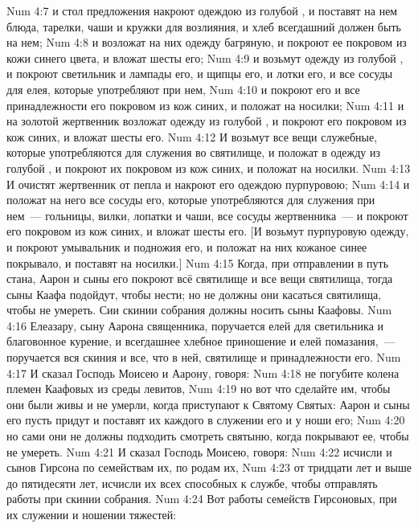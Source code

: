 \vs Num 4:7 и стол  предложения накроют одеждою из голубой , и поставят на нем блюда, тарелки, чаши и кружки для возлияния, и хлеб  всегдашний должен быть на нем;
\vs Num 4:8 и возложат на них одежду багряную, и покроют ее покровом из кожи синего цвета, и вложат шесты его;
\vs Num 4:9 и возьмут одежду из голубой , и покроют светильник и лампады его, и щипцы его, и лотки его, и все сосуды для елея, которые употребляют при нем,
\vs Num 4:10 и покроют его и все принадлежности его покровом из кож синих, и положат на носилки;
\vs Num 4:11 и на золотой жертвенник возложат одежду из голубой , и покроют его покровом из кож синих, и вложат шесты его.
\vs Num 4:12 И возьмут все вещи служебные, которые употребляются для служения во святилище, и положат в одежду из голубой , и покроют их покровом из кож синих, и положат на носилки.
\vs Num 4:13 И очистят жертвенник от пепла и накроют его одеждою пурпуровою;
\vs Num 4:14 и положат на него все сосуды его, которые употребляются для служения при нем~--- гольницы, вилки, лопатки и чаши, все сосуды жертвенника~--- и покроют его покровом из кож синих, и вложат шесты его. [И возьмут пурпуровую одежду, и покроют умывальник и подножия его, и положат на них кожаное синее покрывало, и поставят на носилки.]
\vs Num 4:15 Когда, при отправлении в путь стана, Аарон и сыны его покроют всё святилище и все вещи святилища, тогда сыны Каафа подойдут, чтобы нести; но не должны они касаться святилища, чтобы не умереть. Сии  скинии собрания должны носить сыны Каафовы.
\vs Num 4:16 Елеазару, сыну Аарона священника, поручается елей для светильника и благовонное курение, и всегдашнее хлебное приношение и елей помазания,~--- поручается вся скиния и все, что в ней, святилище и принадлежности его.
\rsbpar\vs Num 4:17 И сказал Господь Моисею и Аарону, говоря:
\vs Num 4:18 не погубите колена племен Каафовых из среды левитов,
\vs Num 4:19 но вот что сделайте им, чтобы они были живы и не умерли, когда приступают к Святому Святых: Аарон и сыны его пусть придут и поставят их каждого в служении его и у ноши его;
\vs Num 4:20 но сами они не должны подходить смотреть святыню, когда покрывают ее, чтобы не умереть.
\rsbpar\vs Num 4:21 И сказал Господь Моисею, говоря:
\vs Num 4:22 исчисли и сынов Гирсона по семействам их, по родам их,
\vs Num 4:23 от тридцати лет и выше до пятидесяти лет, исчисли их всех способных к службе, чтобы отправлять работы при скинии собрания.
\vs Num 4:24 Вот работы семейств Гирсоновых, при их служении и ношении тяжестей:
